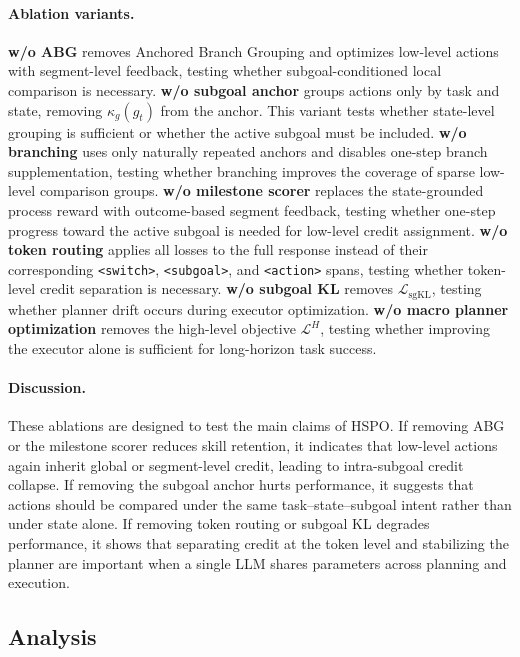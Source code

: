 \documentclass{article}
\begin{document}
\paragraph{Ablation variants.}
\textbf{w/o ABG} removes Anchored Branch Grouping and optimizes low-level actions with segment-level feedback, testing whether subgoal-conditioned local comparison is necessary.
\textbf{w/o subgoal anchor} groups actions only by task and state, removing $\kappa_g(g_t)$ from the anchor. This variant tests whether state-level grouping is sufficient or whether the active subgoal must be included.
\textbf{w/o branching} uses only naturally repeated anchors and disables one-step branch supplementation, testing whether branching improves the coverage of sparse low-level comparison groups.
\textbf{w/o milestone scorer} replaces the state-grounded process reward with outcome-based segment feedback, testing whether one-step progress toward the active subgoal is needed for low-level credit assignment.
\textbf{w/o token routing} applies all losses to the full response instead of their corresponding \texttt{<switch>}, \texttt{<subgoal>}, and \texttt{<action>} spans, testing whether token-level credit separation is necessary.
\textbf{w/o subgoal KL} removes $\mathcal{L}_{\mathrm{sgKL}}$, testing whether planner drift occurs during executor optimization.
\textbf{w/o macro planner optimization} removes the high-level objective $\mathcal{L}^H$, testing whether improving the executor alone is sufficient for long-horizon task success.

\paragraph{Discussion.}
These ablations are designed to test the main claims of HSPO. If removing ABG or the milestone scorer reduces skill retention, it indicates that low-level actions again inherit global or segment-level credit, leading to intra-subgoal credit collapse. If removing the subgoal anchor hurts performance, it suggests that actions should be compared under the same task--state--subgoal intent rather than under state alone. If removing token routing or subgoal KL degrades performance, it shows that separating credit at the token level and stabilizing the planner are important when a single LLM shares parameters across planning and execution.

\subsection{Analysis}
\end{document}
